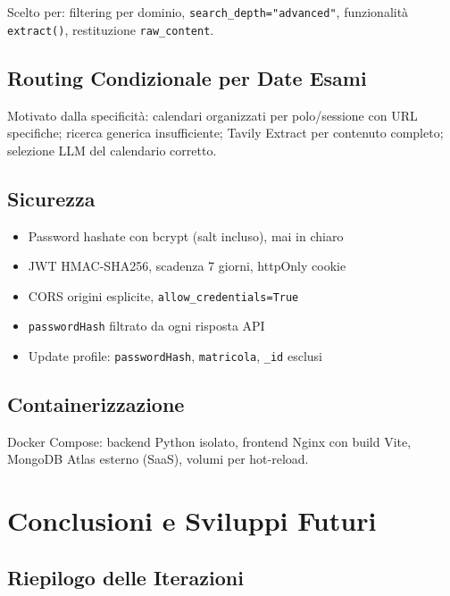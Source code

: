 \documentclass[a4paper,12pt]{report}
\begin{document}
Scelto per: filtering per dominio, \texttt{search\_depth="advanced"}, funzionalità \texttt{extract()}, restituzione \texttt{raw\_content}.

\section{Routing Condizionale per Date Esami}

Motivato dalla specificità: calendari organizzati per polo/sessione con URL specifiche; ricerca generica insufficiente; Tavily Extract per contenuto completo; selezione LLM del calendario corretto.

\section{Sicurezza}

\begin{itemize}
    \item Password hashate con bcrypt (salt incluso), mai in chiaro
    \item JWT HMAC-SHA256, scadenza 7 giorni, httpOnly cookie
    \item CORS origini esplicite, \texttt{allow\_credentials=True}
    \item \texttt{passwordHash} filtrato da ogni risposta API
    \item Update profile: \texttt{passwordHash}, \texttt{matricola}, \texttt{\_id} esclusi
\end{itemize}

\section{Containerizzazione}

Docker Compose: backend Python isolato, frontend Nginx con build Vite, MongoDB Atlas esterno (SaaS), volumi per hot-reload.


\chapter{Conclusioni e Sviluppi Futuri}

\section{Riepilogo delle Iterazioni}
\end{document}
